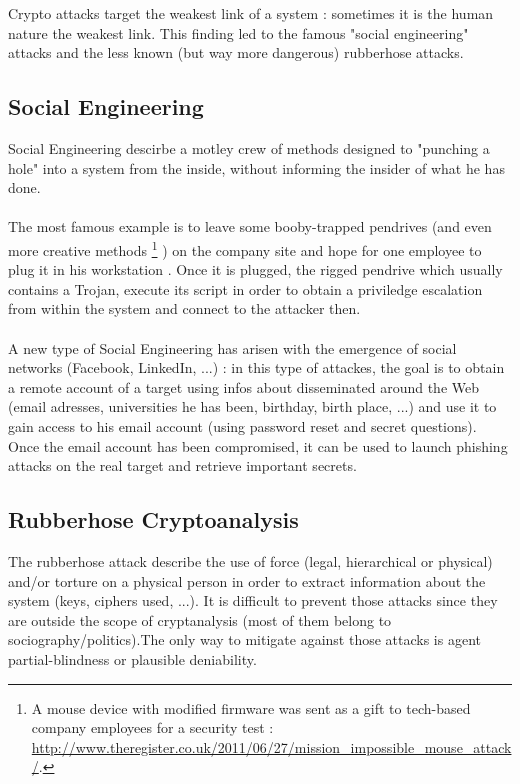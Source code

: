 Crypto attacks target the weakest link of a system : sometimes it is the human nature the weakest link. This finding led to the famous "social engineering" attacks and the less known (but way more dangerous) rubberhose attacks.

\subsection{Social Engineering}

Social Engineering descirbe a motley crew of methods designed to "punching a hole" into a system from the inside, without informing the insider of what he has done. \\\\
The most famous example is to leave some booby-trapped pendrives (and even more creative methods 
\footnote{ A mouse device with modified firmware was sent as a gift to tech-based company employees for a security test : \url{ http://www.theregister.co.uk/2011/06/27/mission_impossible_mouse_attack/}.  }
) on the company site and hope for one employee to plug it in his workstation . Once it is plugged, the rigged pendrive which usually contains a Trojan, execute its script in order to obtain a priviledge escalation from within the system and connect to the attacker then.\\\\
A new type of Social Engineering has arisen with the emergence of social networks (Facebook, LinkedIn, ...) : in this type of attackes, the goal is to obtain a remote account of a target using infos about disseminated around the Web (email adresses, universities he has been, birthday, birth place, ...) and use it to gain access to his email account (using password reset and secret questions). Once the email account has been compromised, it can be used to launch phishing attacks on the real target and retrieve important secrets.


\subsection{Rubberhose Cryptoanalysis}

The rubberhose attack describe the use of force (legal, hierarchical or physical) and/or torture on a physical person in order to extract information about the system (keys, ciphers used, ...). It is difficult to prevent those attacks since they are outside the scope of cryptanalysis (most of them belong to sociography/politics).The only way to mitigate against those attacks is agent partial-blindness or plausible deniability.

